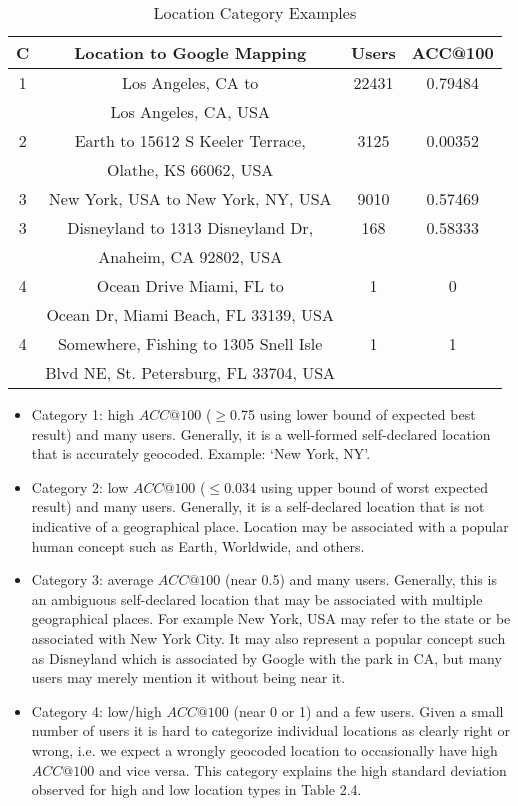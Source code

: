\begin{table}
\small
\renewcommand{\arraystretch}{1.2}
\caption{Location Category Examples}
\label{table_ch2_7}
\centering
\begin{tabular}{|c|c|c|c|}
\hline
\bfseries C & \bfseries Location to Google Mapping & \bfseries Users & \bfseries ACC@100\\
\hline
1&Los Angeles, CA to&22431&0.79484\\
&Los Angeles, CA, USA& & \\
\hline
2&Earth to 15612 S Keeler Terrace,&3125&0.00352\\
&Olathe, KS 66062, USA& & \\
\hline
3&New York, USA to New York, NY, USA&9010&0.57469\\
\hline
3&Disneyland to 1313 Disneyland Dr,&168&0.58333\\
&Anaheim, CA 92802, USA& & \\
\hline
4&Ocean Drive Miami, FL to&1&0\\
&Ocean Dr, Miami Beach, FL 33139, USA& & \\
\hline
4&Somewhere, Fishing to 1305 Snell Isle&1&1\\
&Blvd NE, St. Petersburg, FL 33704, USA& & \\
\hline
\end{tabular}
\end{table}

\begin{itemize}
\item Category 1: high $ACC@100$ ($\geq$0.75 using lower bound of expected best result) and many users. Generally, it is a well-formed self-declared location that is accurately geocoded. Example: `New York, NY'.  

\item Category 2: low $ACC@100$ ($\leq$0.034 using upper bound of worst expected result) and many users. Generally, it is a self-declared location that is not indicative of a geographical place. Location may be associated with a popular human concept such as Earth, Worldwide, and others. 

\item Category 3: average $ACC@100$ (near 0.5) and many users. Generally, this is an ambiguous self-declared location that may be associated with multiple geographical places. For example New York, USA may refer to the state or be associated with New York City. It may also represent a popular concept such as Disneyland which is associated by Google with the park in CA, but many users may merely mention it without being near it. 

\item Category 4: low/high $ACC@100$ (near 0 or 1) and a few users. Given a small number of users it is hard to categorize individual locations as clearly right or wrong, i.e. we expect a wrongly geocoded location to occasionally have high $ACC@100$ and vice versa. This category explains the high standard deviation observed for high and low location types in Table 2.4.
\end{itemize}

